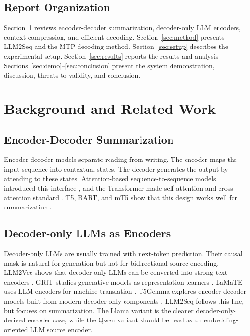 \documentclass[11pt]{article}
\begin{document}
\subsection{Report Organization}

Section~\ref{sec:related} reviews encoder-decoder summarization, decoder-only LLM encoders, context compression, and efficient decoding.
Section~\ref{sec:method} presents LLM2Seq and the MTP decoding method.
Section~\ref{sec:setup} describes the experimental setup.
Section~\ref{sec:results} reports the results and analysis.
Sections~\ref{sec:demo}--\ref{sec:conclusion} present the system demonstration, discussion, threats to validity, and conclusion.

\section{Background and Related Work}
\label{sec:related}

\subsection{Encoder-Decoder Summarization}

Encoder-decoder models separate reading from writing.
The encoder maps the input sequence into contextual states.
The decoder generates the output by attending to these states.
Attention-based sequence-to-sequence models introduced this interface \citep{sutskever2014sequence,bahdanau2015neural}, and the Transformer made self-attention and cross-attention standard \citep{vaswani2017attention}.
T5, BART, and mT5 show that this design works well for summarization \citep{raffel2020t5,lewis2020bart,xue2021mt5}.

\subsection{Decoder-only LLMs as Encoders}

Decoder-only LLMs are usually trained with next-token prediction.
Their causal mask is natural for generation but not for bidirectional source encoding.
LLM2Vec shows that decoder-only LLMs can be converted into strong text encoders \citep{behnamghader2024llm2vec}.
GRIT studies generative models as representation learners \citep{muennighoff2024grit}.
LaMaTE uses LLM encoders for machine translation \citep{luo2025lamate}.
T5Gemma explores encoder-decoder models built from modern decoder-only components \citep{zhang2025t5gemma2}.
LLM2Seq follows this line, but focuses on summarization.
The Llama variant is the cleaner decoder-only-derived encoder case, while the Qwen variant should be read as an embedding-oriented LLM source encoder.
\end{document}

